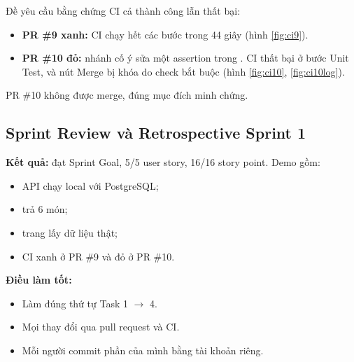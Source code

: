 
Đề yêu cầu bằng chứng CI cả thành công lẫn thất bại:
\begin{itemize}
\item \textbf{PR \#9 xanh:} CI chạy hết các bước trong 44 giây (hình \ref{fig:ci9}).
\item \textbf{PR \#10 đỏ:} nhánh  cố ý sửa một assertion trong . CI thất bại ở bước Unit Test, và nút Merge bị khóa do check bắt buộc (hình \ref{fig:ci10}, \ref{fig:ci10log}).
\end{itemize}

PR \#10 không được merge, đúng mục đích minh chứng.


\subsection{Sprint Review và Retrospective Sprint 1}
\textbf{Kết quả:} đạt Sprint Goal, 5/5 user story, 16/16 story point. Demo gồm:
\begin{itemize}
\item API chạy local với PostgreSQL;
\item {} trả 6 món;
\item trang  lấy dữ liệu thật;
\item CI xanh ở PR \#9 và đỏ ở PR \#10.
\end{itemize}

\textbf{Điều làm tốt:}
\begin{itemize}
\item Làm đúng thứ tự Task 1 $\rightarrow$ 4.
\item Mọi thay đổi qua pull request và CI.
\item Mỗi người commit phần của mình bằng tài khoản riêng.
\end{itemize}


